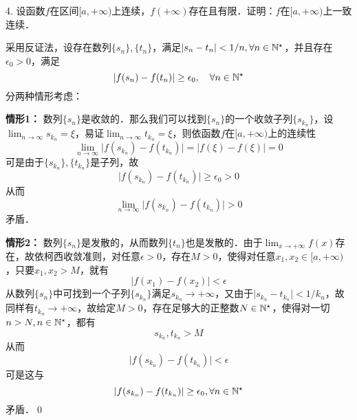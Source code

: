 4. 设函数$f$在区间$[a, +\infty)$上连续，$f(+\infty)$存在且有限．证明：$f$在$[a, +\infty)$上一致连续．

\prove 采用反证法，设存在数列$\{ s_n \}, \{ t_n \}$，满足$\lvert s_n - t_n \rvert < 1/n, \forall n \in \mathbb{N}^\star$，并且存在$\epsilon_0 > 0$，满足
\begin{equation}
    \lvert f(s_n) - f(t_n) \rvert \geq \epsilon_0, \quad \forall n \in \mathbb{N}^\star
\end{equation}
分两种情形考虑：

\textbf{情形1：} 数列$\{ s_n \}$是收敛的．那么我们可以找到$\{ s_n \}$的一个收敛子列$\{ s_{k_n} \}$，设$\displaystyle\lim_{n \to \infty} s_{k_n} = \xi$，易证$\displaystyle\lim_{n \to \infty} t_{k_n} = \xi$，则依函数$f$在$[a,+\infty)$上的连续性
\begin{equation}
    \lim_{n \to \infty} \lvert f(s_{k_n}) - f(t_{k_n}) \rvert = \lvert f(\xi) - f(\xi) \rvert = 0
\end{equation}
可是由于$\{s_{k_n}\}, \{t_{k_n}\}$是子列，故
\begin{equation}
    \lvert f(s_{k_n}) - f(t_{k_n}) \rvert \geq \epsilon_0 > 0
\end{equation}
从而
\begin{equation}
    \lim_{n \to \infty} \lvert f(s_{k_n}) - f(t_{k_n}) \rvert > 0
\end{equation}
矛盾．

\textbf{情形2：} 数列$\{ s_n \}$是发散的，从而数列$\{ t_n \}$也是发散的．由于$\displaystyle\lim_{x \to +\infty} f(x)$存在，故依柯西收敛准则，对任意$\epsilon > 0$，存在$M > 0$，使得对任意$x_1, x_2 \in [a, +\infty)$，只要$x_1, x_2 > M$，就有
\begin{equation}
    \lvert f(x_1) - f(x_2) \rvert < \epsilon
\end{equation}
从数列$\{ s_n \}$中可找到一个子列$\{ s_{k_n}\}$满足$s_{k_n} \to +\infty$，又由于$\lvert s_{k_n} - t_{k_n} \rvert < 1/k_n$，故同样有$t_{k_n} \to +\infty$，故给定$M > 0$，存在足够大的正整数$N \in \mathbb{N}^\star$，使得对一切$n > N, n \in \mathbb{N}^\star$，都有
\begin{equation}
    s_{k_n}, t_{k_n} > M
\end{equation}
从而
\begin{equation}
    \lvert f(s_{k_n}) - f(t_{k_n}) \rvert < \epsilon
\end{equation}
可是这与
\begin{equation}
    \lvert f(s_{k_n}) - f(t_{k_n}) \rvert \geq \epsilon_0, \forall n \in \mathbb{N}^\star
\end{equation}
矛盾．\qed\bigskip

